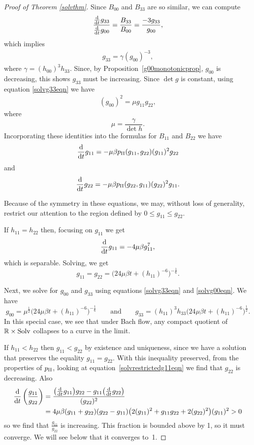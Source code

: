 \documentclass[pdftex]{sigma}
\numberwithin{equation}{section}
\newcommand{\dtime}{\frac{{\rm d}}{{\rm d} t}} %
\begin{document}
\begin{proof}[Proof of Theorem \ref{solvthm}]
Since $B_{00}$ and $B_{33}$ are so similar, we can compute
\begin{equation*}
\frac{\dtime g_{33}}{\dtime g_{00}} = \frac{B_{33}}{B_{00}}
			= \frac{-3 g_{33}}{g_{00}},
\end{equation*}
which implies
\begin{gather} \label{solvg33eqn}
g_{33} = \gamma (g_{00})^{-3},
\end{gather}
where $\gamma = (h_{00})^3 h_{33}$. Since, by Proposition~\ref{g00monotonicprop}, $g_{00}$ is decreasing, this shows $g_{33}$ must be increasing. Since $\det g$ is constant, using equation \eqref{solvg33eqn} we have
\begin{gather} \label{solvg00eqn}
(g_{00})^2 = \mu g_{11} g_{22},
\end{gather}
where
\[
\mu = \frac{\gamma}{\det h}.
\]
Incorporating these identities into the formulas for $B_{11}$ and $B_{22}$ we have
\begin{gather} \label{solvrestrictedg11eqn}
\dtime g_{11} = -\mu \beta p_{\rm II}(g_{11}, g_{22}) (g_{11})^2 g_{22}
\end{gather}
and
\[
\dtime g_{22} = -\mu \beta p_{\rm II}(g_{22}, g_{11}) (g_{22})^2 g_{11}.
\]

Because of the symmetry in these equations, we may, without loss of generality, restrict our attention to the region defined by $0 \leq g_{11} \leq g_{22}$.

If $h_{11} = h_{22}$ then, focusing on $g_{11}$ we get
\[
\dtime g_{11} = -4\mu \beta g_{11}^7,
\]
which is separable. Solving, we get
\[
g_{11} = g_{22} = \big(24 \mu \beta t + (h_{11})^{-6} \big)^{-\frac{1}{6}}.
\]

Next, we solve for $g_{00}$ and $g_{33}$ using equations \eqref{solvg33eqn} and \eqref{solvg00eqn}. We have
\[
g_{00} = \mu^{\frac{1}{2}} \bigl(24 \mu \beta t + (h_{11})^{-6} \bigr)^{-\frac{1}{6}}
\qquad \text{and} \qquad
g_{33} = (h_{11})^3 h_{33} \bigl(24 \mu \beta t + (h_{11})^{-6} \bigr)^{\frac{1}{2}}.
\]
In this special case, we see that under Bach flow, any compact quotient of $\mathbb{R} \times {\rm Solv}$ collapses to a curve in the limit.

If $h_{11} < h_{22}$ then $g_{11} < g_{22}$ by existence and uniqueness, since we have a solution that preserves the equality $g_{11} = g_{22}$. With this inequality preserved, from the properties of $p_{\rm II}$, looking at equation~\eqref{solvrestrictedg11eqn} we find that $g_{22}$ is decreasing. Also
\begin{align*}
\dtime \left(\frac{g_{11}}{g_{22}} \right)
	&= \frac{\big(\dtime g_{11} \big) g_{22} - g_{11} \big(\dtime g_{22} \big)}{(g_{22})^2} \\
	&= 4 \mu \beta (g_{11} + g_{22})(g_{22} - g_{11})
					\big(2(g_{11})^2 + g_{11} g_{22} + 2 (g_{22})^2 \big) (g_{11})^2 > 0
\end{align*}
so we find that $\frac{g_{11}}{g_{22}}$ is increasing. This fraction is bounded above by 1, so it must converge. We will see below that it converges to~1.


\end{proof}
\end{document}
